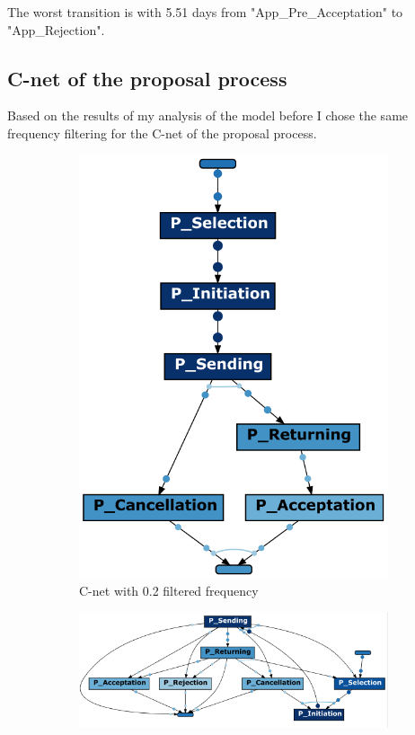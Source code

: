 The worst transition is with 5.51 days from "App\_Pre\_Acceptation" to "App\_Rejection".

\subsection{C-net of the proposal process}

Based on the results of my analysis of the model before I chose the same frequency filtering for the C-net of the proposal process.
\begin{figure}[!htbp]
\centering
\begin{subfigure}{0.3\textwidth}
\includegraphics[width = 0.9\linewidth]{PCnet0-2.PNG}
\caption{C-net with 0.2 filtered frequency}
\label{fig:cnetP0-2}
\end{subfigure}
\begin{subfigure}{0.6\textwidth}
\includegraphics[width = 0.9\linewidth]{PropC-Net0.PNG}

\end{subfigure}
\end{figure}
